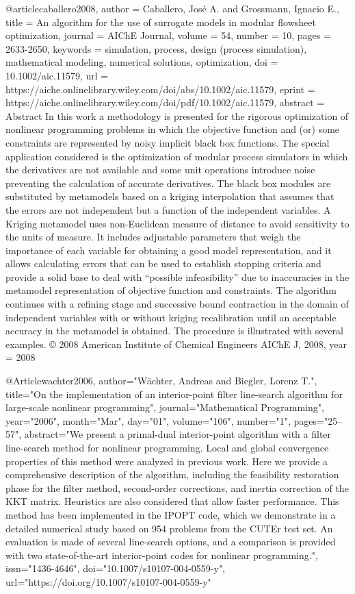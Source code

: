 @article{caballero2008,
	author = {Caballero, José A. and Grossmann, Ignacio E.},
	title = {An algorithm for the use of surrogate models in modular flowsheet optimization},
	journal = {AIChE Journal},
	volume = {54},
	number = {10},
	pages = {2633-2650},
	keywords = {simulation, process, design (process simulation), mathematical modeling, numerical solutions, optimization},
	doi = {10.1002/aic.11579},
	url = {https://aiche.onlinelibrary.wiley.com/doi/abs/10.1002/aic.11579},
	eprint = {https://aiche.onlinelibrary.wiley.com/doi/pdf/10.1002/aic.11579},
	abstract = {Abstract In this work a methodology is presented for the rigorous optimization of nonlinear programming problems in which the objective function and (or) some constraints are represented by noisy implicit black box functions. The special application considered is the optimization of modular process simulators in which the derivatives are not available and some unit operations introduce noise preventing the calculation of accurate derivatives. The black box modules are substituted by metamodels based on a kriging interpolation that assumes that the errors are not independent but a function of the independent variables. A Kriging metamodel uses non-Euclidean measure of distance to avoid sensitivity to the units of measure. It includes adjustable parameters that weigh the importance of each variable for obtaining a good model representation, and it allows calculating errors that can be used to establish stopping criteria and provide a solid base to deal with “possible infeasibility” due to inaccuracies in the metamodel representation of objective function and constraints. The algorithm continues with a refining stage and successive bound contraction in the domain of independent variables with or without kriging recalibration until an acceptable accuracy in the metamodel is obtained. The procedure is illustrated with several examples. © 2008 American Institute of Chemical Engineers AIChE J, 2008},
	year = {2008}
}

@Article{wachter2006,
author="W{\"a}chter, Andreas
and Biegler, Lorenz T.",
title="On the implementation of an interior-point filter line-search algorithm for large-scale nonlinear programming",
journal="Mathematical Programming",
year="2006",
month="Mar",
day="01",
volume="106",
number="1",
pages="25--57",
abstract="We present a primal-dual interior-point algorithm with a filter line-search method for nonlinear programming. Local and global convergence properties of this method were analyzed in previous work. Here we provide a comprehensive description of the algorithm, including the feasibility restoration phase for the filter method, second-order corrections, and inertia correction of the KKT matrix. Heuristics are also considered that allow faster performance. This method has been implemented in the IPOPT code, which we demonstrate in a detailed numerical study based on 954 problems from the CUTEr test set. An evaluation is made of several line-search options, and a comparison is provided with two state-of-the-art interior-point codes for nonlinear programming.",
issn="1436-4646",
doi="10.1007/s10107-004-0559-y",
url="https://doi.org/10.1007/s10107-004-0559-y"
}

